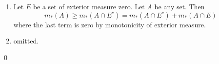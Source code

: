 \begin{problem} \hfil
	\begin{enumerate}[label = (\alph*)]
		\item Let $E$ be a set of exterior measure zero.
			Let $A$ be any set.
			Then
			\[
				m_*(A) \geq m_*(A\cap E^c) = m_*(A\cap E^c) + m_*(A\cap E)
			\]
			where the last term is zero by monotonicity of exterior measure.

		\item omitted.
	\end{enumerate}

	\qed
\end{problem}

